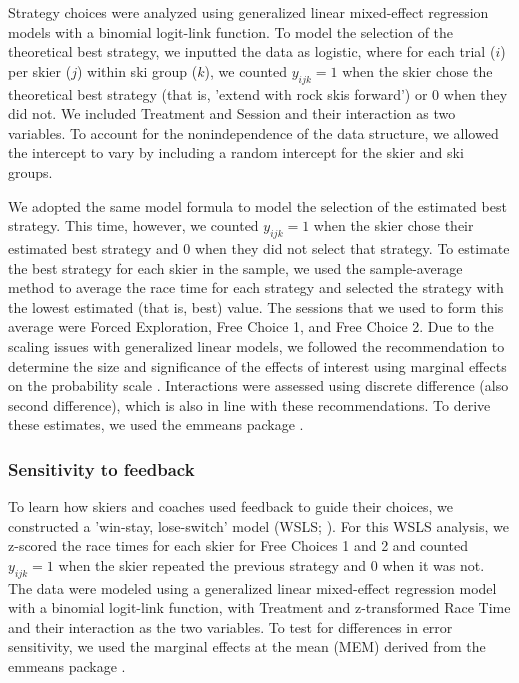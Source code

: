 \documentclass[pdflatex,sn-mathphys-num]{sn-jnl}%
\theoremstyle{thmstyleone}%
\theoremstyle{thmstyletwo}%
\theoremstyle{thmstylethree}%
\begin{document}
Strategy choices were analyzed using generalized linear mixed-effect regression models with a binomial logit-link function. To model the selection of the theoretical best strategy, we inputted the data as logistic, where for each trial (\(i\)) per skier (\(j\)) within ski group (\(k\)), we counted \(y_{ijk}=1\) when the skier chose the theoretical best strategy (that is, 'extend with rock skis forward') or 0 when they did not. We included Treatment and Session and their interaction as two variables. To account for the nonindependence of the data structure, we allowed the intercept to vary by including a random intercept for the skier and ski groups.

We adopted the same model formula to model the selection of the estimated best strategy. This time, however, we counted \(y_{ijk}=1\) when the skier chose their estimated best strategy and 0 when they did not select that strategy. To estimate the best strategy for each skier in the sample, we used the sample-average method \cite{sutton_reinforcement_2018} to average the race time for each strategy and selected the strategy with the lowest estimated (that is, best) value. The sessions that we used to form this average were Forced Exploration, Free Choice 1, and Free Choice 2.  Due to the scaling issues with generalized linear models, we followed the recommendation to determine the size and significance of the effects of interest using marginal effects on the probability scale \cite{mize_best_2019, mccabe_interpreting_2022}. Interactions were assessed using discrete difference (also second difference), which is also in line with these recommendations. To derive these estimates, we used the emmeans package \cite{lenth_emmeans_2023}.

\subsubsection{Sensitivity to feedback}

To learn how skiers and coaches used feedback to guide their choices, we constructed a 'win-stay, lose-switch' model (WSLS; \cite{nowak_strategy_1993, worthy_comparison_2014, iyer_probing_2020}). For this WSLS analysis, we z-scored the race times for each skier for Free Choices 1 and 2 and counted \(y_{ijk}=1\) when the skier repeated the previous strategy and 0 when it was not. The data were modeled using a generalized linear mixed-effect regression model with a binomial logit-link function, with Treatment and z-transformed Race Time and their interaction as the two variables. To test for differences in error sensitivity, we used the marginal effects at the mean (MEM) derived from the emmeans package \cite{lenth_emmeans_2023}.
\end{document}
